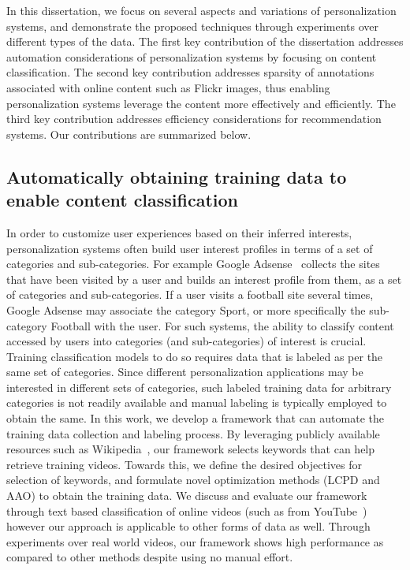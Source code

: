 \documentclass[12pt]{ucsddissertation}
\begin{document}

In this dissertation, we focus on several aspects and variations of personalization systems, and demonstrate the proposed techniques through experiments over different types of the data. The first key contribution of the dissertation addresses automation considerations of personalization systems by focusing on content classification. The second key contribution addresses sparsity of annotations associated with online content such as Flickr images, thus enabling personalization systems leverage the content more effectively and efficiently. The third key contribution addresses efficiency considerations for recommendation systems. Our contributions are summarized below. 

\subsection{Automatically obtaining training data to enable content classification}

In order to customize user experiences based on their inferred interests, personalization systems often build user interest profiles in terms of a set of categories and sub-categories. For example Google Adsense~\cite{GoogleAdsense} collects the sites that have been visited by a user and builds an interest profile from them, as a set of categories and sub-categories. If a user visits a football site several times, Google Adsense may associate the category Sport, or more specifically the sub-category Football with the user. For such systems, the ability to classify content accessed by users into categories (and sub-categories) of interest is crucial. Training classification models to do so requires data that is labeled as per the same set of categories. Since different personalization applications may be interested in different sets of categories, such labeled training data for arbitrary categories is not readily available and manual labeling is typically employed to obtain the same. In this work, we develop a framework that can automate the training data collection and labeling process. 
By leveraging publicly available resources such as Wikipedia~\cite{website:Wikipedia}, our framework selects keywords that can help retrieve training videos. 
Towards this, we define the desired objectives for selection of keywords, and formulate novel optimization methods (LCPD and AAO) to obtain the training data. 
We discuss and evaluate our framework through text based classification of online videos (such as from YouTube~\cite{Youtube}) however our approach is applicable to other forms of data as well. 
Through experiments over real world videos, our framework shows high performance as compared to other methods despite using no manual effort. 
\end{document}
